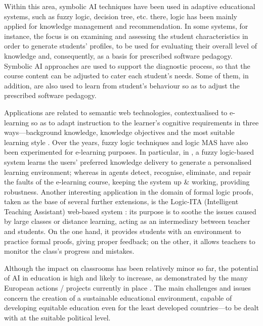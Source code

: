 \documentclass[12pt,a4paper,openright,twoside]{book}
\begin{document}
Within this area, symbolic AI techniques have been used in adaptive educational systems, such as fuzzy logic, decision tree, etc. there, logic has been mainly applied for knowledge management and recommendation.
%
In some systems, for instance, the focus is on examining and assessing the student characteristics in order to generate students' profiles, to be used for evaluating their overall level of knowledge and, consequently, as a basis for prescribed software pedagogy.
%
Symbolic AI approaches are used to support the diagnostic process, so that the course content can be adjusted to cater each student's needs.
Some of them, in addition, are also used to learn from student's behaviour so as to adjust the prescribed software pedagogy.

Applications are related to semantic web technologies, contextualised to e-learning so as to adapt instruction to the learner’s cognitive requirements in three ways---background knowledge, knowledge objectives and the most suitable learning style \cite{guangzuo2004,sancho2005}.
%
Over the years, fuzzy logic techniques and logic MAS have also been experimented for e-learning purposes.
%
In particular, in \cite{almohammadi2013,chrysafiadi2013}, a fuzzy logic-based system learns the users' preferred knowledge delivery to generate a personalised learning environment; whereas in \cite{gong2006} agents detect, recognise, eliminate, and repair the faults of the e-learning course, keeping the system up \& working, providing robustness.
%
Another interesting application in the domain of formal logic proofs, taken as the base of several further extensions, is the Logic-ITA (Intelligent Teaching Assistant) web-based system \cite{yacef2005}: its purpose is to soothe the issues caused by large classes or distance learning, acting as an intermediary between teacher and students.
%
On the one hand, it provides students with an environment to practice formal proofs, giving proper feedback;  on the other, it allows teachers to monitor the class's progress and mistakes.

Although the impact on classrooms has been relatively minor so far, the potential of AI in education is high and likely to increase, as demonstrated by the many European actions / projects currently in place \cite{pedro2019,tuomi2018}.
%
The main challenges and issues concern the creation of a sustainable educational environment, capable of developing equitable education even for the least developed countries---to be dealt with at the suitable political level.
\end{document}
